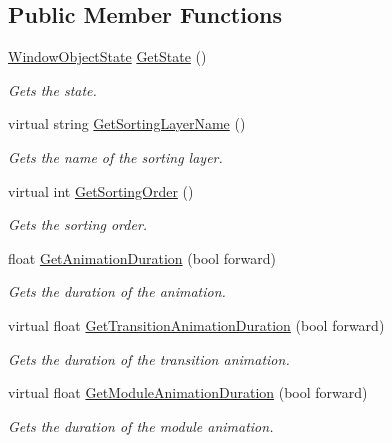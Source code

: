 \subsection*{Public Member Functions}
\begin{DoxyCompactItemize}
\item 
\hyperlink{namespace_unity_engine_1_1_u_i_1_1_windows_aa2b8efef4db5d0280e4019ea89bb63ec}{Window\+Object\+State} \hyperlink{class_unity_engine_1_1_u_i_1_1_windows_1_1_window_base_a7f3a8dd20bf459be36c2310291bd1976}{Get\+State} ()
\begin{DoxyCompactList}\small\item\em Gets the state. \end{DoxyCompactList}\item 
virtual string \hyperlink{class_unity_engine_1_1_u_i_1_1_windows_1_1_window_base_a17722d97d983d1a1ef2fd8ca2611dcde}{Get\+Sorting\+Layer\+Name} ()
\begin{DoxyCompactList}\small\item\em Gets the name of the sorting layer. \end{DoxyCompactList}\item 
virtual int \hyperlink{class_unity_engine_1_1_u_i_1_1_windows_1_1_window_base_ae1a26ecd23c220198447de1e51ace960}{Get\+Sorting\+Order} ()
\begin{DoxyCompactList}\small\item\em Gets the sorting order. \end{DoxyCompactList}\item 
float \hyperlink{class_unity_engine_1_1_u_i_1_1_windows_1_1_window_base_ae454bb12e1f4b9f756ddf31aa33677ee}{Get\+Animation\+Duration} (bool forward)
\begin{DoxyCompactList}\small\item\em Gets the duration of the animation. \end{DoxyCompactList}\item 
virtual float \hyperlink{class_unity_engine_1_1_u_i_1_1_windows_1_1_window_base_a1f7d1d4a4712bf82dc5a11ea54aa3bf4}{Get\+Transition\+Animation\+Duration} (bool forward)
\begin{DoxyCompactList}\small\item\em Gets the duration of the transition animation. \end{DoxyCompactList}\item 
virtual float \hyperlink{class_unity_engine_1_1_u_i_1_1_windows_1_1_window_base_a6fa8883696c18133230291831d87e628}{Get\+Module\+Animation\+Duration} (bool forward)
\begin{DoxyCompactList}\small\item\em Gets the duration of the module animation. \end{DoxyCompactList}\item 

\end{DoxyCompactItemize}
